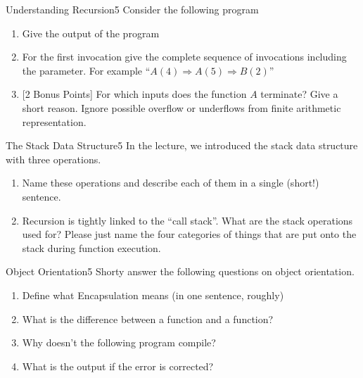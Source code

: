 \documentclass[twoside]{article}
\begin{document}
  \clearpage
  \begin{task}{Understanding Recursion}{5}{}
    Consider the following program
    

    \begin{enumerate}
    \item{Give the output of the program\vspace{2cm}}
    \item{For the first invocation  give the complete sequence of invocations including the parameter. For example
      ``$A(4) \Rightarrow A(5) \Rightarrow B(2)$''}\vspace{4cm}
      \clearpage
     \item{[2 Bonus Points] For which inputs does the function $A$ terminate? Give a short reason. Ignore possible overflow or underflows from finite arithmetic representation.\vspace{2cm}}

    \end{enumerate}
    

  \end{task}
  \clearpage
  \begin{task}{The Stack Data Structure}{5}{}
    In the lecture, we introduced the stack data structure with three operations.

    \begin{enumerate}
    \item{Name these operations and describe each of them in a single (short!) sentence.\vspace{5cm}}
    \item{Recursion is tightly linked to the ``call stack''. What are the stack operations used for? Please just name
      the four categories of things that are put onto the stack during function execution.}
      \end{enumerate}
    \end{task}
    \clearpage
    \begin{task}{Object Orientation}{5}{}
      Shorty answer the following questions on object orientation.
      \begin{enumerate} 
      \item{Define what Encapsulation means (in one sentence, roughly)\vspace{4cm}}
      \item{What is the difference between a function and a  function?\vspace{2cm}}
      \item{Why doesn't the following program compile?
        \vspace{2cm}}
      \item{What is the output if the error is corrected?\vspace{2cm}}
        
        
        
        \end{enumerate}


    \end{task}
\end{document}
